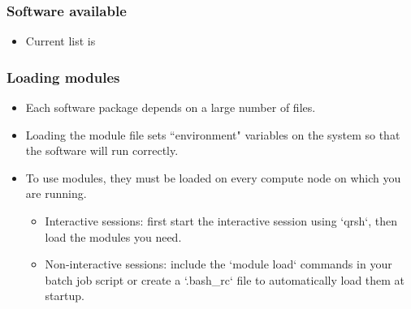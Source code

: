 \documentclass{beamer}
\begin{document}
\begin{frame}
\frametitle{Software available}
\begin{itemize}
\item Current list is 
\begin{table}[htdp]
\begin{center}
\end{center}
\label{default}
\end{table}
\end{itemize}
\end{frame}

\begin{frame}
\frametitle{Loading modules}
\begin{itemize}
\item Each software package depends on a large number of files.
\item Loading the module file sets ``environment" variables on the system so that the software will run correctly.
\item To use modules, they must be loaded on every compute node on which you are running.
\begin{itemize}
\item Interactive sessions: first start the interactive session using `qrsh`, then load the modules you need.
\item Non-interactive sessions: include the `module load` commands in your batch job script or create a `.bash\_rc` file to automatically load them at startup.
\end{itemize}
\end{itemize}
\end{frame}
\end{document}
